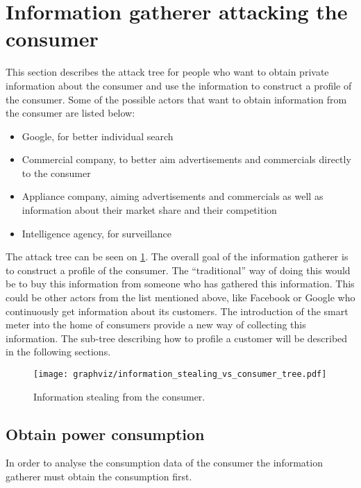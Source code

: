 \section{Information gatherer attacking the consumer}\label{informationGathererVsConsumer}
This section describes the attack tree for people who want to obtain private information about the consumer and use the information to construct a profile of the consumer.
Some of the possible actors that want to obtain information from the consumer are listed below:
\begin{itemize}
\item Google, for better individual search
\item Commercial company, to better aim advertisements and commercials directly to the consumer
\item Appliance company, aiming advertisements and commercials as well as information about their market share and their competition
\item Intelligence agency, for surveillance
\end{itemize}

The attack tree can be seen on \cref{information_stealing_tree}.
The overall goal of the information gatherer is to construct a profile of the consumer.
The ``traditional'' way of doing this would be to buy this information from someone who has gathered this information.
This could be other actors from the list mentioned above, like Facebook or Google who continuously get information about its customers.
The introduction of the smart meter into the home of consumers provide a new way of collecting this information.
The sub-tree describing how to profile a customer will be described in the following sections.


\begin{figure}
  \begin{center}
    \texttt{[image: graphviz/information\_stealing\_vs\_consumer\_tree.pdf]}
  \end{center}
  \caption{Information stealing from the consumer.}
  \label{information_stealing_tree}
\end{figure}

\subsection{Obtain power consumption}
In order to analyse the consumption data of the consumer the information gatherer must obtain the consumption first.

